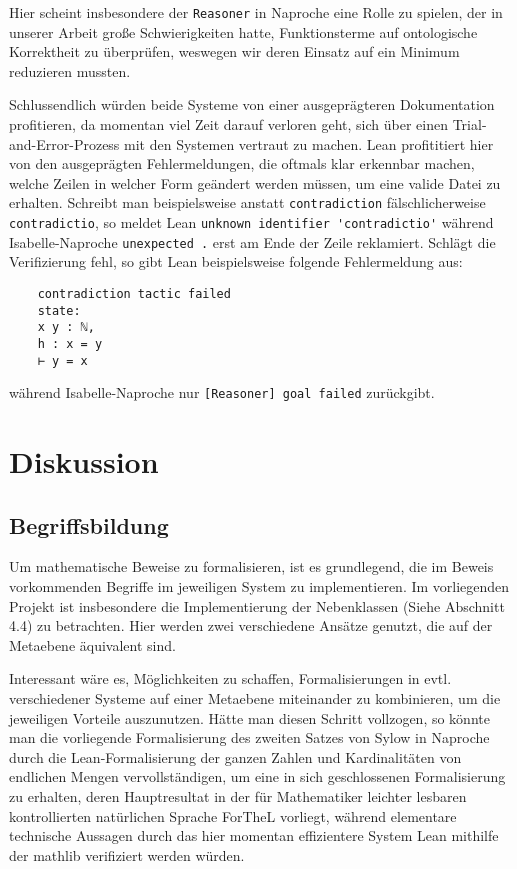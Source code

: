 \documentclass[a4paper,12pt]{scrartcl}
\begin{document}
Hier scheint insbesondere der \verb!Reasoner! in Naproche eine Rolle zu spielen, der in unserer Arbeit große Schwierigkeiten hatte, Funktionsterme auf ontologische Korrektheit zu überprüfen, weswegen wir deren Einsatz auf ein Minimum reduzieren mussten.

Schlussendlich würden beide Systeme von einer ausgeprägteren Dokumentation profitieren, da momentan viel Zeit darauf verloren geht, sich über einen Trial-and-Error-Prozess mit den Systemen vertraut zu machen.
Lean profititiert hier von den ausgeprägten Fehlermeldungen, die oftmals klar erkennbar machen, welche Zeilen in welcher Form geändert werden müssen, um eine valide Datei zu erhalten.
Schreibt man beispielsweise anstatt \verb!contradiction! fälschlicherweise \verb!contradictio!, so meldet Lean \verb!unknown identifier 'contradictio'! während Isabelle-Naproche \verb!unexpected .! erst am Ende der Zeile reklamiert. Schlägt die Verifizierung fehl, so gibt Lean beispielsweise folgende Fehlermeldung aus:
\begin{lstlisting}
    contradiction tactic failed
    state:
    x y : ℕ,
    h : x = y
    ⊢ y = x
\end{lstlisting}
während Isabelle-Naproche nur \verb![Reasoner] goal failed! zurückgibt.



\newpage

\section{Diskussion}

\subsection{Begriffsbildung}

Um mathematische Beweise zu formalisieren, ist es grundlegend, die im Beweis vorkommenden Begriffe im jeweiligen System zu implementieren. Im vorliegenden Projekt ist insbesondere die Implementierung der Nebenklassen (Siehe Abschnitt 4.4) zu betrachten. Hier werden zwei verschiedene Ansätze genutzt, die auf der Metaebene äquivalent sind.

Interessant wäre es, Möglichkeiten zu schaffen, Formalisierungen in evtl. verschiedener Systeme auf einer Metaebene miteinander zu kombinieren, um die jeweiligen Vorteile auszunutzen. Hätte man diesen Schritt vollzogen, so könnte man die vorliegende Formalisierung des zweiten Satzes von Sylow in Naproche durch die Lean-Formalisierung der ganzen Zahlen und Kardinalitäten von endlichen Mengen vervollständigen, um eine in sich geschlossenen Formalisierung zu erhalten, deren Hauptresultat in der für Mathematiker leichter lesbaren kontrollierten natürlichen Sprache ForTheL vorliegt, während elementare technische Aussagen durch das hier momentan effizientere System Lean mithilfe der mathlib verifiziert werden würden.
\end{document}
